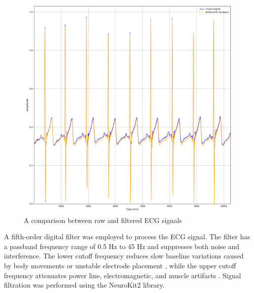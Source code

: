 \documentclass[journal]{IEEEtran}
\begin{document}
\begin{figure}[htbp]
    \centering
    \includegraphics[width=0.76\linewidth]{Filtr_EKG.png} 
    \caption{A comparison between raw and filtered ECG signals}
    \label{fig:filtr_ekg}
\end{figure}

A fifth-order digital filter was employed to process the ECG signal. The filter has a passband frequency range of 0.5 Hz to 45 Hz and suppresses both noise and interference. The lower cutoff frequency reduces slow baseline variations caused by body movements or unstable electrode placement \cite{24}, while the upper cutoff frequency attenuates power line, electromagnetic, and muscle artifacts \cite{25}. Signal filtration was performed using the NeuroKit2 library.
\end{document}
